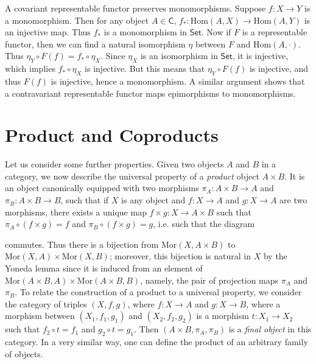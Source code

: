 A covariant representable functor preserves monomorphisms. Suppose $f: X \to Y$ is a monomorphism. Then for any object $A \in \mathsf{C}$, $f_*: \text{Hom}(A,X) \to \text{Hom}(A,Y)$ is an injective map. Thus $f_*$ is a monomorphism in $\mathsf{Set}$. Now if $F$ is a representable functor, then we can find a natural isomorphism $\eta$ between $F$ and $\text{Hom}(A,\cdot)$. Thus $\eta_Y \circ F(f) = f_* \circ \eta_X$. Since $\eta_X$ is an isomorphism in $\mathsf{Set}$, it is injective, which implies $f_* \circ \eta_X$ is injective. But this means that $\eta_Y \circ F(f)$ is injective, and thus $F(f)$ is injective, hence a monomorphism. A similar argument shows that a contravariant representable functor maps epimorphisms to monomorphisms.

\section{Product and Coproducts}

Let us consider some further properties. Given two objects $A$ and $B$ in a category, we now describe the universal property of a \emph{product} object $A \times B$. It is an object canonically equipped with two morphisms $\pi_A: A \times B \to A$ and $\pi_B: A \times B \to B$, such that if $X$ is any object and $f: X \to A$ and $g: X \to A$ are two morphisms, there exists a unique map $f \times g: X \to A \times B$ such that $\pi_A \circ (f \times g) = f$ and $\pi_B \circ (f \times g) = g$, i.e. such that the diagram
%
\begin{center}
\end{center}
%
commutes. Thus there is a bijection from $\text{Mor}(X,A \times B)$ to $\text{Mor}(X,A) \times \text{Mor}(X,B)$; moreover, this bijection is natural in $X$ by the Yoneda lemma since it is induced from an element of $\text{Mor}(A \times B, A) \times \text{Mor}(A \times B, B)$, namely, the pair of projection maps $\pi_A$ and $\pi_B$. To relate the construction of a product to a universal property, we consider the category of triples $(X,f,g)$, where $f: X \to A$ and $g: X \to B$, where a morphism between $(X_1,f_1,g_1)$ and $(X_2,f_2,g_2)$ is a morphism $t: X_1 \to X_2$ such that $f_2 \circ t = f_1$ and $g_2 \circ t = g_1$. Then $(A \times B, \pi_A, \pi_B)$ is a \emph{final object} in this category. In a very similar way, one can define the product of an arbitrary family of objects.


